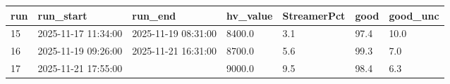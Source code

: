 \documentclass{article}
\begin{document}
\begin{table}[]
\begin{tabular}{@{}lllllll@{}}
\toprule
run & run\_start          & run\_end            & hv\_value & StreamerPct & good & good\_unc \\ \midrule
15  & 2025-11-17 11:34:00 & 2025-11-19 08:31:00 & 8400.0    & 3.1         & 97.4 & 10.0      \\
16  & 2025-11-19 09:26:00 & 2025-11-21 16:31:00 & 8700.0    & 5.6         & 99.3 & 7.0       \\
17  & 2025-11-21 17:55:00 &                     & 9000.0    & 9.5         & 98.4 & 6.3       \\ \bottomrule
\end{tabular}
\end{table}
\end{document}
